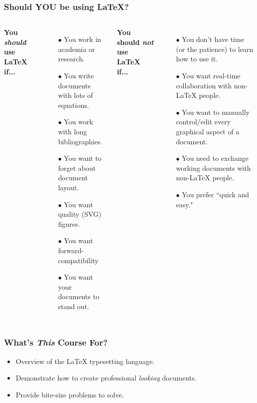 \begin{frame}[fragile]
\frametitle{Should YOU be using \LaTeX{}?}
    \begin{columns}
    \small
        \textbf{You \emph{should} use \LaTeX{} if...} \pause
        \begin{itemize}
            \item[$\bullet$] You work in academia or research. \pause
            \item[$\bullet$] You write documents with lots of equations. \pause
            \item[$\bullet$] You work with long bibliographies. \pause
            \item[$\bullet$] You want to forget about document layout. \pause
            \item[$\bullet$] You want quality {\footnotesize(SVG)} figures. \pause
            \item[$\bullet$] You want forward-compatibility \pause
            \item[$\bullet$] You want your documents to stand out. \pause
        \end{itemize}
        \textbf{You should \emph{not} use \LaTeX{} if...} \pause
        \begin{itemize}
            \item[$\bullet$] You don't have time (or the patience) to learn how to use it. \pause
            \item[$\bullet$] You want real-time collaboration with non-\LaTeX{} people. \pause
            \item[$\bullet$] You want to manually control/edit every graphical aspect of a document. \pause
            \item[$\bullet$] You need to exchange working documents with non-\LaTeX{} people. \pause
            \item[$\bullet$] You prefer ``quick and easy." 
        \end{itemize}
    \end{columns}
\end{frame}


\begin{frame}[fragile]
\frametitle{What's \emph{This} Course For?}
    \begin{itemize}[$\bullet$]
        \item Overview of the \LaTeX{} typesetting language.
        \item Demonstrate how to create professional \textit{looking} documents. 
        \item Provide bite-size problems to solve.
    \end{itemize}
\end{frame}




